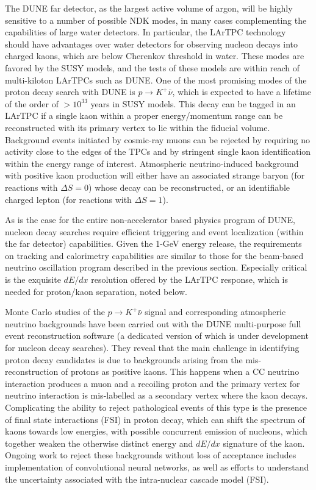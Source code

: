 The DUNE far detector, as the largest active volume of argon, will be highly sensitive to a number of possible NDK modes, in many cases complementing the capabilities of large water detectors.  In particular, the LArTPC technology should have advantages over water detectors for observing nucleon decays into charged kaons, which are below Cherenkov threshold in water. These modes are favored by the SUSY models, and the tests of these models are within reach of multi-kiloton LArTPCs such as DUNE. One of the most promising modes of the proton decay search with DUNE is $p\to K^+ \bar{\nu}$, which is expected to have a lifetime of the order of $>10^{33}$ years in SUSY models. This decay can be tagged in an LArTPC if a single kaon within a proper energy/momentum range can be reconstructed with its primary vertex to lie within the fiducial volume. Background events initiated by cosmic-ray muons can be rejected by requiring no activity close to the edges of the TPCs and by stringent single kaon identification within the energy range of interest. Atmospheric neutrino-induced background with positive kaon production will either have an associated strange baryon (for reactions with $\Delta S = 0$) whose decay can be reconstructed, or an identifiable charged lepton (for reactions with $\Delta S = 1$). 

As is the case for the entire non-accelerator based physics program of DUNE, nucleon decay searches require efficient triggering and event localization (within the far detector) capabilities.  Given the 1-GeV energy release, the requirements on tracking and calorimetry capabilities are similar to those for the beam-based neutrino oscillation program described in the previous section.  Especially critical is the exquisite $dE/dx$ resolution offered by the LArTPC response, which is needed for proton/kaon separation, noted below.

Monte Carlo studies of the $p\to K^+ \bar{\nu}$ signal and corresponding atmospheric neutrino backgrounds have been carried out with the DUNE multi-purpose full event reconstruction software (a dedicated version of which is under development for nucleon decay searches).  They reveal that the main challenge in identifying proton decay candidates is due to backgrounds arising from the mis-reconstruction of protons as positive kaons. This happens when a CC neutrino interaction produces a muon and a recoiling proton and the primary vertex for neutrino interaction is mis-labelled as a secondary vertex where the kaon decays.  Complicating the ability to reject pathological events of this type is the presence of final state interactions (FSI) in proton decay, which can shift the spectrum of kaons towards low energies, with possible concurrent emission of nucleons, which together weaken the otherwise distinct energy and $dE/dx$ signature of the kaon. Ongoing work to reject these backgrounds without loss of acceptance includes implementation of convolutional neural networks, as well as efforts to understand the uncertainty associated with the intra-nuclear cascade model (FSI). 

